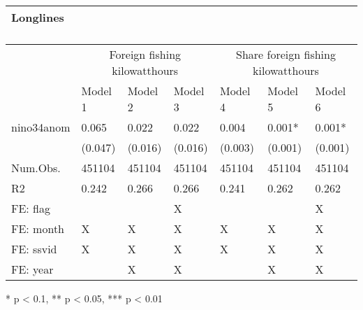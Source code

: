 \captionsetup[table]{labelformat=empty,skip=1pt}
\begin{longtable}{lllllll}
\caption*{
\large Longlines\\ 
\small \\ 
} \\ 
\toprule
& \multicolumn{3}{c}{Foreign fishing kilowatthours} & \multicolumn{3}{c}{Share foreign fishing kilowatthours} \\ 
 \cmidrule(lr){2-4}\cmidrule(lr){5-7}
  & Model 1 & Model 2 & Model 3 & Model 4 & Model 5 & Model 6 \\ 
\midrule
nino34anom & 0.065 & 0.022 & 0.022 & 0.004 & 0.001* & 0.001* \\ 
 & (0.047) & (0.016) & (0.016) & (0.003) & (0.001) & (0.001) \\ 
Num.Obs. & 451104 & 451104 & 451104 & 451104 & 451104 & 451104 \\ 
R2 & 0.242 & 0.266 & 0.266 & 0.241 & 0.262 & 0.262 \\ 
FE:  flag &  &  & X &  &  & X \\ 
FE:  month & X & X & X & X & X & X \\ 
FE:  ssvid & X & X & X & X & X & X \\ 
FE:  year &  & X & X &  & X & X \\ 
\bottomrule
\end{longtable}
\begin{minipage}{\linewidth}
* p < 0.1, ** p < 0.05, *** p < 0.01\\ 
\end{minipage}

